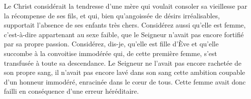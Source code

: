 Le Christ considérait la tendresse d’une mère
	qui voulait consoler sa vieillesse par la récompense de ses fils,
	et qui, bien qu’angoissée de désirs irréalisables,
	supportait l’absence de ses enfants très chers.
Considérez aussi qu’elle est femme, c’est-à-dire appartenant au sexe faible,
	que le Seigneur n’avait pas encore fortifié par sa propre passion.
Considérez, dis-je, qu’elle est fille d’Ève
	et qu’elle succombe à la convoitise immodérée qui, de cette première femme,
	s’est transfusée à toute sa descendance.
Le Seigneur ne l’avait pas encore rachetée de son propre sang,
	il n’avait pas encore lavé dans son sang
		cette ambition coupable d’un honneur immodéré,
	enracinée dans le cœur de tous.
Cette femme avait donc failli en conséquence d’une erreur héréditaire.
